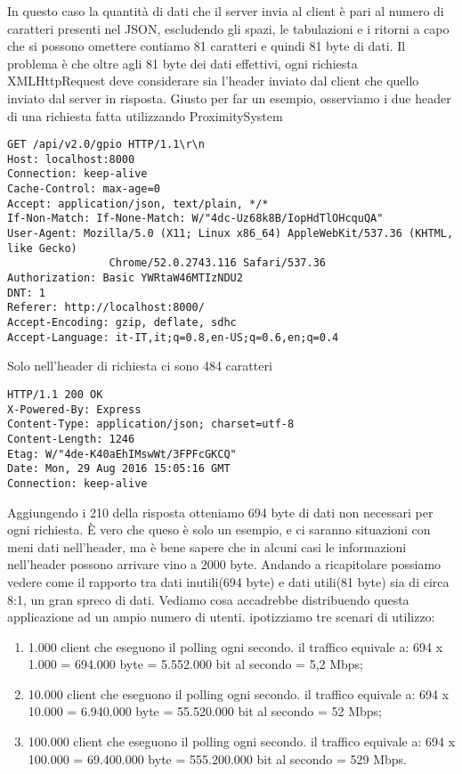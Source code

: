 In questo caso la quantità di dati che il server invia al client è pari al numero di caratteri presenti nel JSON, escludendo gli spazi, le tabulazioni e i ritorni a capo che si possono omettere contiamo 81 caratteri e quindi 81 byte di dati.
Il problema è che oltre agli 81 byte dei dati effettivi, ogni richiesta XMLHttpRequest deve considerare sia l'header inviato dal client che quello inviato dal server in risposta.
Giusto per far un esempio, osserviamo i due header di una richiesta fatta utilizzando ProximitySystem
\begin{lstlisting}[caption={header client}, style=javaScriptCode]
GET /api/v2.0/gpio HTTP/1.1\r\n
Host: localhost:8000
Connection: keep-alive
Cache-Control: max-age=0
Accept: application/json, text/plain, */*
If-Non-Match: If-None-Match: W/"4dc-Uz68k8B/IopHdTlOHcquQA"
User-Agent: Mozilla/5.0 (X11; Linux x86_64) AppleWebKit/537.36 (KHTML, like Gecko) 
				Chrome/52.0.2743.116 Safari/537.36
Authorization: Basic YWRtaW46MTIzNDU2
DNT: 1
Referer: http://localhost:8000/
Accept-Encoding: gzip, deflate, sdhc
Accept-Language: it-IT,it;q=0.8,en-US;q=0.6,en;q=0.4
\end{lstlisting}
Solo nell'header di richiesta ci sono 484 caratteri
\begin{lstlisting}[caption={header server}, style=javaScriptCode]
HTTP/1.1 200 OK
X-Powered-By: Express
Content-Type: application/json; charset=utf-8
Content-Length: 1246
Etag: W/"4de-K40aEhIMswWt/3FPFcGKCQ"
Date: Mon, 29 Aug 2016 15:05:16 GMT
Connection: keep-alive

\end{lstlisting} 
Aggiungendo i 210 della risposta otteniamo 694 byte di dati non necessari per ogni richiesta. 
È vero che queso è solo un esempio, e ci saranno situazioni con meni dati nell'header, ma è bene sapere che in alcuni casi le informazioni nell'header possono arrivare vino a 2000 byte.
Andando a ricapitolare possiamo vedere come il rapporto tra dati inutili(694 byte) e dati utili(81 byte) sia di  circa 8:1, un gran spreco di dati.
Vediamo cosa accadrebbe distribuendo questa applicazione ad un ampio numero di utenti. 
ipotizziamo tre scenari di utilizzo:
\begin{enumerate}
\item 1.000 client che eseguono il polling ogni secondo.
il traffico equivale a: 694 x 1.000 = 694.000 byte = 5.552.000 bit al secondo = 5,2 Mbps;
\item 10.000 client che eseguono il polling ogni secondo.
il traffico equivale a: 694 x 10.000 = 6.940.000 byte = 55.520.000 bit al secondo = 52 Mbps;
\item 100.000 client che eseguono il polling ogni secondo.
il traffico equivale a: 694 x 100.000 = 69.400.000 byte = 555.200.000 bit al secondo = 529 Mbps.
\end{enumerate}
